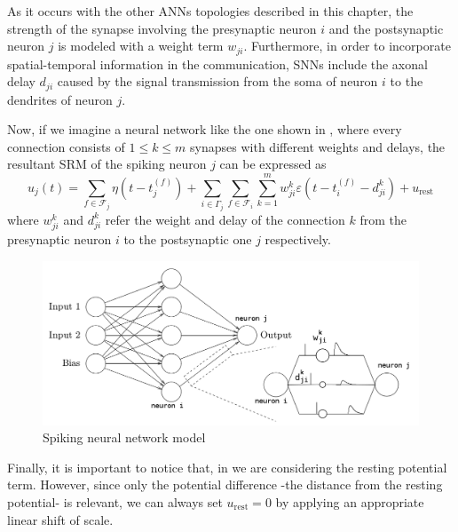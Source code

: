 As it occurs with the other ANNs topologies described in this chapter,
the strength of the synapse involving the presynaptic neuron $i$ and the postsynaptic neuron $j$ is modeled with a weight term $w_{ji}$.
Furthermore, in order to incorporate spatial-temporal information in the communication, SNNs include the axonal delay $d_{ji}$ caused by the signal transmission from the soma of neuron $i$ to the dendrites of neuron $j$.

Now, if we imagine a neural network like the one shown in , 
where every connection consists of $1 \leq k \leq m$ synapses with different weights and delays, 
the resultant SRM of the spiking neuron $j$ can be expressed as
\begin{equation}
u_{j}(t)=
\sum_{f\in \mathcal{F}_{j}}\eta(t-t_{j}^{(f)})+
\sum_{i\in \Gamma_{j}}
\sum_{f\in \mathcal{F}_{i}}
\sum_{k=1}^{m}
	w_{ji}^{k}\varepsilon(t-t_{i}^{(f)}-d_{ji}^k)+u_{\text{rest}}
\label{eq:srmmultipleconnections}
\end{equation}
where $w_{ji}^k$ and $d_{ji}^k$ refer the weight and delay of the connection $k$ from the presynaptic neuron $i$ to the postsynaptic one $j$ respectively.

\begin{figure}[!ht]
\centering
\includegraphics[width=1\textwidth]{images/snn.png}
\caption{Spiking neural network model}
\label{fig:snn}
\end{figure} 

Finally, it is important to notice that, in  we are considering the resting potential term. However, since only the potential difference -the distance from the resting potential- is relevant, we can always set $u_{\text{rest}}=0$ by applying an appropriate linear shift of scale.